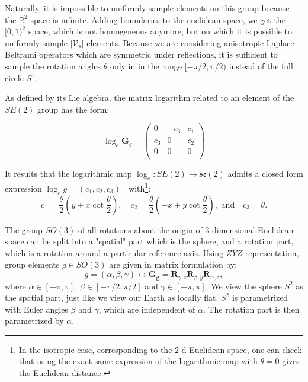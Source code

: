 \documentclass{article}
\begin{document}
Naturally, it is impossible to uniformly sample elements on this group because the $\mathbb{R}^2$ space is infinite. Adding boundaries to the euclidean space, we get the $[0, 1)^2$ space, which is not homogeneous anymore, but on which it is possible to uniformly sample $|\mathcal{V}_s|$ elements. Because we are considering anisotropic Laplace-Beltrami operators which are symmetric under reflections, it is sufficient to sample the rotation angles $\theta$ only in in the range $[-\pi/2, \pi/2)$ instead of the full circle $S^1$.

As defined by its Lie algebra, the matrix logarithm related to an element of the $SE(2)$ group has the form:

\begin{equation}
\log_e \boldsymbol{G}_g = 
\left(
\begin{array}{ccc}
0 & -c_3 & c_1 \\
c_3 & 0 & c_2 \\
0 & 0 & 0 \\
\end{array}
\right)
\end{equation}

It results that the logarithmic map $\log_e : SE(2) \to \mathfrak{se}(2)$ admits a closed form expression $\log_e g = (c_1, c_2, c_3)^\top$ with\footnote{In the isotropic case, corresponding to the $2$-d Euclidean space, one can check that using the exact same expression of the logarithmic map with $\theta = 0$ gives the Euclidean distance.}:
\begin{equation}
c_1 = \frac{\theta}{2} \left(y + x \cot \frac{\theta}{2} \right)
, \quad
c_2 = \frac{\theta}{2} \left(-x + y \cot \frac{\theta}{2} \right)
, \text{ and} \quad
c_3 = \theta.
\end{equation}


The group $SO(3)$ of all rotations about the origin of 3-dimensional Euclidean space can be split into a "spatial" part which is the sphere, and a rotation part, which is a rotation around a particular reference axis. Using $ZYZ$ representation, group elements $g \in SO(3)$ are given in matrix formulation by:
\begin{equation}
g = (\alpha, \beta, \gamma) \leftrightarrow 
\boldsymbol{G_g} = \boldsymbol{R}_{\gamma, z} \boldsymbol{R}_{\beta, y} \boldsymbol{R}_{\alpha, z},
\end{equation}
where $\alpha \in [-\pi, \pi]$, $\beta \in [-\pi/2, \pi/2]$ and $\gamma \in [-\pi, \pi]$. We view the sphere $S^2$ as the spatial part, just like we view our Earth as locally flat. $S^2$ is parametrized with Euler angles $\beta$ and $\gamma$, which are independent of $\alpha$. The rotation part is then parametrized by $\alpha$. 
\end{document}
